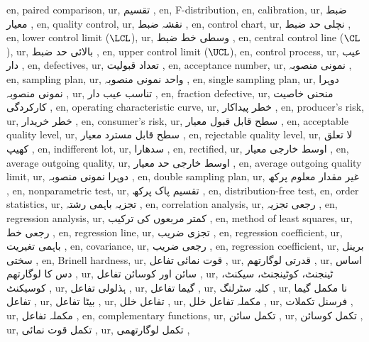 en, paired comparison,
ur, تقسیم ,
en, F-distribution,
en, calibration,
ur, ضبط معیار ,
en, quality control,
ur, نقشہ ضبط ,
en, control chart,
ur, نچلی حد ضبط ,
en, lower control limit ($\LCL $),
ur, وسطی خط ضبط ,
en, central control line ($\CL $),
ur, بالائی حد ضبط ,
en, upper control limit ($\UCL $),
en, control process,
ur, عیب دار ,
en, defectives,
ur, تعداد قبولیت ,
en, acceptance number,
ur, نمونی منصوبہ ,
en, sampling plan,
ur, واحد نمونی منصوبہ ,
en, single sampling plan,
ur, دوہرا نمونی منصوبہ ,
ur, تناسب عیب دار ,
en, fraction defective,
ur, منحنی خاصیت کارکردگی ,
en, operating characteristic curve,
ur, خطر پیداکار ,
en, producer's risk,
ur, خطر خریدار ,
en, consumer's risk,
ur, سطح قابل قبول معیار ,
en, acceptable quality level,
ur, سطح قابل مسترد معیار ,
en, rejectable quality level,
ur, لا تعلق کھیپ ,
en, indifferent lot,
ur, سدھارا ,
en, rectified,
ur, اوسط خارجی معیار ,
en, average outgoing quality,
ur, اوسط خارجی حد معیار ,
en, average outgoing quality limit,
ur, دوہرا نمونی منصوبہ ,
en, double sampling plan,
ur, غیر مقدار معلوم پرکھ ,
en, nonparametric test,
ur, تقسیم پاک پرکھ ,
en, distribution-free test,
en, order statistics,
ur, تجزیہ باہمی رشتہ ,
en, correlation analysis,
ur, رجعی تجزیہ ,
en, regression analysis,
ur, کمتر مربعوں کی ترکیب ,
en, method of least squares,
ur, رجعی خط ,
en, regression line,
ur, تجزی ضریب  ,
en, regression coefficient,
ur, باہمی تغیریت ,
en, covariance,
ur, رجعی ضریب  ,
en, regression coefficient,
ur, برینل سختی ,
en, Brinell hardness,
ur, قوت نمائی تفاعل ,
ur, قدرتی لوگارتھم ,
ur, اساس دس کا لوگارتھم ,
ur, سائن اور کوسائن تفاعل ,
ur, ٹینجنٹ، کوٹینجنٹ، سیکنٹ، کوسیکنٹ ,
ur, ہذلولی تفاعل ,
ur, گیما تفاعل ,
ur, کلیہ سٹرلنگ ,
ur, نا مکمل گیما تفاعل ,
ur, بیٹا تفاعل ,
ur, تفاعل خلل ,
ur, مکملہ تفاعل خلل ,
ur, فرسنل تکملات ,
ur, مکملہ تفاعل ,
en, complementary functions,
ur, تکمل سائن ,
ur, تکمل کوسائن ,
ur, تکمل قوت نمائی ,
ur, تکمل لوگارتھمی ,
